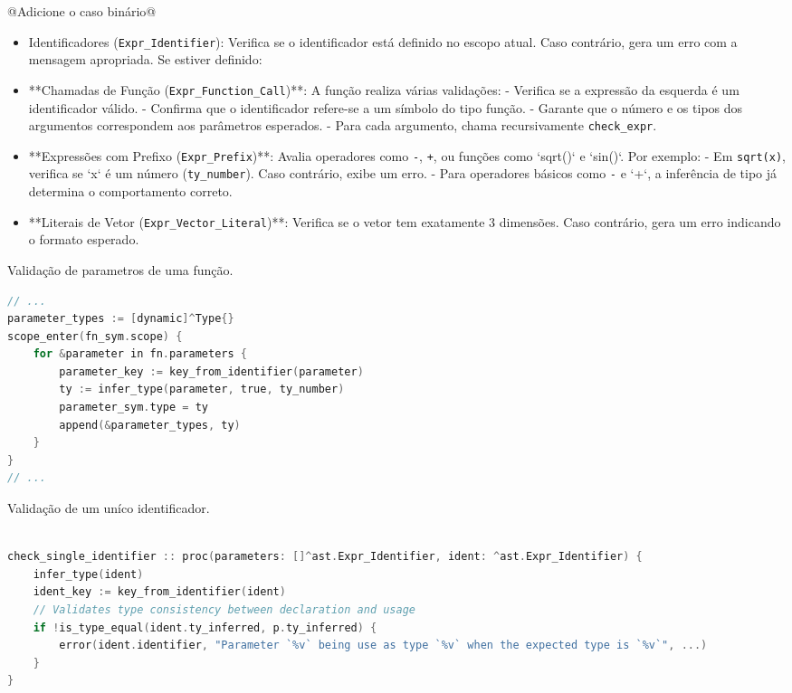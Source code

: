 @Adicione o caso binário@
\begin{itemize}
    
    \item Identificadores (\verb`Expr_Identifier`): 
      Verifica se o identificador está definido no escopo atual. Caso contrário, gera um erro com a mensagem apropriada. Se estiver definido:
    \item **Chamadas de Função (\verb`Expr_Function_Call`)**:  
      A função realiza várias validações:
      - Verifica se a expressão da esquerda é um identificador válido.
      - Confirma que o identificador refere-se a um símbolo do tipo função.
      - Garante que o número e os tipos dos argumentos correspondem aos parâmetros esperados.
      - Para cada argumento, chama recursivamente \verb`check_expr`.
    \item **Expressões com Prefixo (\verb`Expr_Prefix`)**:  
      Avalia operadores como \verb`-`, \verb`+`, ou funções como `sqrt()` e `sin()`. Por exemplo:
      - Em \verb`sqrt(x)`, verifica se `x` é um número (\verb`ty_number`). Caso contrário, exibe um erro.
      - Para operadores básicos como \verb`-` e `+`, a inferência de tipo já determina o comportamento correto.
    \item **Literais de Vetor (\verb`Expr_Vector_Literal`)**:  
      Verifica se o vetor tem exatamente 3 dimensões. Caso contrário, gera um erro indicando o formato esperado.
\end{itemize}






\begin{codigo}[htb]
    \caption{\small Validação de parametros de uma função. }
    \label{cod-parametros-validation}
\begin{lstlisting}[language=C, numbers=none, frame=none, inputencoding=latin1]
// ...
parameter_types := [dynamic]^Type{}
scope_enter(fn_sym.scope) {
    for &parameter in fn.parameters {
        parameter_key := key_from_identifier(parameter)
        ty := infer_type(parameter, true, ty_number)
        parameter_sym.type = ty
        append(&parameter_types, ty)
    }
}
// ...
\end{lstlisting}
\end{codigo}


\begin{codigo}[htb]
    \caption{\small Validação de um uníco identificador. }
    \label{cod-check-single-ident}
\begin{lstlisting}[language=C, numbers=none, frame=none, inputencoding=latin1]

check_single_identifier :: proc(parameters: []^ast.Expr_Identifier, ident: ^ast.Expr_Identifier) {
    infer_type(ident)
    ident_key := key_from_identifier(ident)
    // Validates type consistency between declaration and usage
    if !is_type_equal(ident.ty_inferred, p.ty_inferred) {
        error(ident.identifier, "Parameter `%v` being use as type `%v` when the expected type is `%v`", ...)
    }
}
\end{lstlisting}
\end{codigo}


